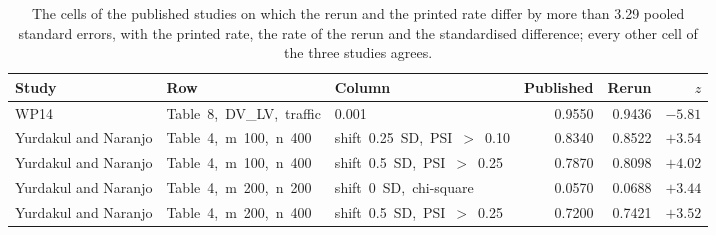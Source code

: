 \begin{table}[htbp]
\centering
\setlength{\tabcolsep}{3pt}
\footnotesize
\caption{The cells of the published studies on which the rerun and the printed rate differ by more than 3.29 pooled standard errors, with the printed rate, the rate of the rerun and the standardised difference; every other cell of the three studies agrees.}
\label{tab:vt-disagree}
\begin{tabular}{lllrrr}
\toprule
Study & Row & Column & Published & Rerun & $z$ \\
\midrule
WP14 & \mbox{Table 8, DV\_LV, traffic} & \mbox{0.001} & 0.9550 & 0.9436 & $-5.81$ \\
Yurdakul and Naranjo & \mbox{Table 4, m 100, n 400} & \mbox{shift 0.25 SD, PSI }$>$\mbox{ 0.10} & 0.8340 & 0.8522 & $+3.54$ \\
Yurdakul and Naranjo & \mbox{Table 4, m 100, n 400} & \mbox{shift 0.5 SD, PSI }$>$\mbox{ 0.25} & 0.7870 & 0.8098 & $+4.02$ \\
Yurdakul and Naranjo & \mbox{Table 4, m 200, n 200} & \mbox{shift 0 SD, chi-square} & 0.0570 & 0.0688 & $+3.44$ \\
Yurdakul and Naranjo & \mbox{Table 4, m 200, n 400} & \mbox{shift 0.5 SD, PSI }$>$\mbox{ 0.25} & 0.7200 & 0.7421 & $+3.52$ \\
\bottomrule
\end{tabular}
\end{table}
